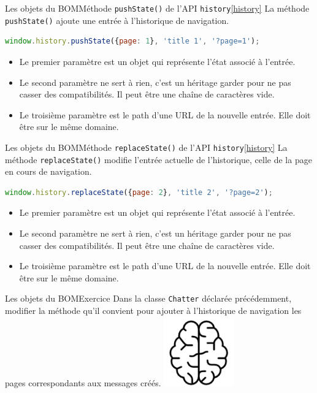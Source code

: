 \documentclass{beamer}
\begin{document}
    \begin{frame}[fragile]{Les objets du BOM}{Méthode \lstinline{pushState()} de l'API \lstinline{history}\cref{history}}
        La méthode \lstinline{pushState()} ajoute une entrée à l'historique de navigation.
        \begin{lstlisting}[language=JavaScript,title={\tiny{Script JavaScript}}]
window.history.pushState({page: 1}, 'title 1', '?page=1');
        \end{lstlisting}
        \begin{itemize}
            \item Le premier paramètre est un objet qui représente l'état associé à l'entrée.
            \item Le second paramètre ne sert à rien, c'est un héritage garder pour ne pas casser des compatibilités.
            Il peut être une chaîne de caractères vide.
            \item Le troisième paramètre est le path d'une URL de la nouvelle entrée.
            Elle doit être sur le même domaine.
        \end{itemize}
    \end{frame}

    \begin{frame}[fragile]{Les objets du BOM}{Méthode \lstinline{replaceState()} de l'API \lstinline{history}\cref{history}}
        La méthode \lstinline{replaceState()} modifie l'entrée actuelle de l'historique, celle de la page en cours de navigation.
        \begin{lstlisting}[language=JavaScript,title={\tiny{Script JavaScript}}]
window.history.replaceState({page: 2}, 'title 2', '?page=2');
        \end{lstlisting}
        \begin{itemize}
            \item Le premier paramètre est un objet qui représente l'état associé à l'entrée.
            \item Le second paramètre ne sert à rien, c'est un héritage garder pour ne pas casser des compatibilités.
            Il peut être une chaîne de caractères vide.
            \item Le troisième paramètre est le path d'une URL de la nouvelle entrée.
            Elle doit être sur le même domaine.
        \end{itemize}
    \end{frame}

    \begin{frame}{Les objets du BOM}{Exercice \execcounterdispinc{}}
        Dans la classe \lstinline{Chatter} déclarée précédemment, modifier la méthode qu'il convient pour ajouter à l'historique de navigation les pages correspondants aux messages créés.
        \bigbreak
        \centering
        \includegraphics[width=3cm]{image/intelligence}
    \end{frame}
\end{document}
